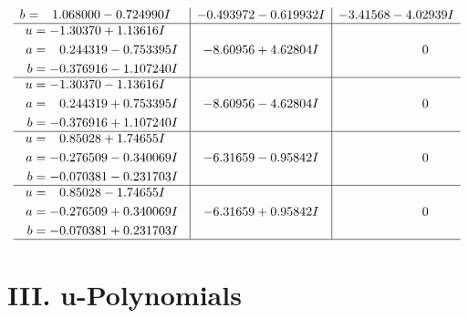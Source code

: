 \documentclass[1p]{elsarticle_modified}
\theoremstyle{definition}
\begin{document}
$$\begin{array}{c|c|c}
\begin{aligned}
b &= \phantom{-}1.068000 - 0.724990 I\end{aligned}
 & -0.493972 - 0.619932 I & -3.41568 - 4.02939 I \\ \hline\begin{aligned}
u &= -1.30370 + 1.13616 I \\
a &= \phantom{-}0.244319 - 0.753395 I \\
b &= -0.376916 - 1.107240 I\end{aligned}
 & -8.60956 + 4.62804 I & \phantom{-0.000000 } 0 \\ \hline\begin{aligned}
u &= -1.30370 - 1.13616 I \\
a &= \phantom{-}0.244319 + 0.753395 I \\
b &= -0.376916 + 1.107240 I\end{aligned}
 & -8.60956 - 4.62804 I & \phantom{-0.000000 } 0 \\ \hline\begin{aligned}
u &= \phantom{-}0.85028 + 1.74655 I \\
a &= -0.276509 - 0.340069 I \\
b &= -0.070381 - 0.231703 I\end{aligned}
 & -6.31659 - 0.95842 I & \phantom{-0.000000 } 0 \\ \hline\begin{aligned}
u &= \phantom{-}0.85028 - 1.74655 I \\
a &= -0.276509 + 0.340069 I \\
b &= -0.070381 + 0.231703 I\end{aligned}
 & -6.31659 + 0.95842 I & \phantom{-0.000000 } 0\\
 \hline 
 \end{array}$$\newpage
\newpage\renewcommand{\arraystretch}{1}
\centering \section*{ III. u-Polynomials}
\end{document}
